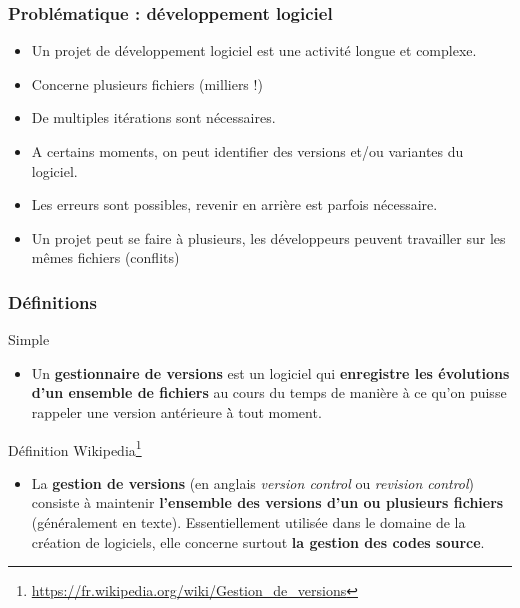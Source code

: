 \documentclass[table,tikz,12pt,svgnames]{beamer}
\begin{document}
\begin{frame}
	\frametitle{Problématique : développement logiciel}
	\begin{block}{}
    \begin{adjustwidth}{-0.3cm}{-1.4cm}{}
		\begin{itemize}
			\item Un \textcolor{title}{projet} de développement logiciel est une activité longue et
			complexe.
			\item Concerne plusieurs \textcolor{title}{fichiers} (milliers !)
			\item De multiples \textcolor{title}{itérations} sont nécessaires.
			\item A certains moments, on peut identifier des \textcolor{title}{versions} et/ou \textcolor{title}{variantes} du logiciel.
			\item Les erreurs sont possibles, \textcolor{title}{revenir en arrière} est parfois nécessaire.
			\item Un projet peut se faire à plusieurs, les développeurs peuvent travailler sur les mêmes fichiers (\textcolor{title}{conflits})
		\end{itemize}
	\end{adjustwidth}
	\end{block}
\end{frame}

\begin{frame}
	\frametitle{Définitions}
		\begin{block}{Simple}
			\begin{itemize}
				\item Un \textbf{gestionnaire de versions} est un logiciel qui \textbf{enregistre les évolutions d’un ensemble de fichiers} au cours du temps de manière à ce qu'on puisse rappeler une version antérieure à̀ tout moment.
			\end{itemize}
		\end{block}
		\begin{block}{Définition Wikipedia\footnote{\url{https://fr.wikipedia.org/wiki/Gestion\_de\_versions}}}
			\begin{itemize}
				\item La \textbf{gestion de versions} (en anglais \textit{version control} ou \textit{revision control}) consiste à maintenir \textbf{l'ensemble des versions d'un ou plusieurs fichiers} (généralement en texte).
				Essentiellement utilisée dans le domaine de la création de logiciels, elle concerne surtout \textbf{la gestion des codes source}.
			\end{itemize}
		\end{block}
\end{frame}
\end{document}
